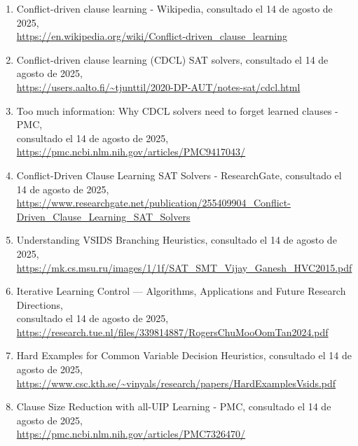 \documentclass{article}
\begin{document}
\begin{enumerate}
\item Conflict-driven clause learning - Wikipedia, consultado el 14 de agosto de 2025, \\ \url{https://en.wikipedia.org/wiki/Conflict-driven_clause_learning}
\item Conflict-driven clause learning (CDCL) SAT solvers, consultado el 14 de agosto de 2025, \\ \url{https://users.aalto.fi/~tjunttil/2020-DP-AUT/notes-sat/cdcl.html}
\item Too much information: Why CDCL solvers need to forget learned clauses - PMC, \\ consultado el 14 de agosto de 2025, \url{https://pmc.ncbi.nlm.nih.gov/articles/PMC9417043/}
\item Conflict-Driven Clause Learning SAT Solvers - ResearchGate, consultado el 14 de agosto de 2025, \\ \url{https://www.researchgate.net/publication/255409904_Conflict-Driven_Clause_Learning_SAT_Solvers}
\item Understanding VSIDS Branching Heuristics, consultado el 14 de agosto de 2025, \\ \url{https://mk.cs.msu.ru/images/1/1f/SAT_SMT_Vijay_Ganesh_HVC2015.pdf}
\item Iterative Learning Control — Algorithms, Applications and Future Research Directions, \\ consultado el 14 de agosto de 2025, \url{https://research.tue.nl/files/339814887/RogersChuMooOomTan2024.pdf}
\item Hard Examples for Common Variable Decision Heuristics, consultado el 14 de agosto de 2025, \\ \url{https://www.csc.kth.se/~vinyals/research/papers/HardExamplesVsids.pdf}
\item Clause Size Reduction with all-UIP Learning - PMC, consultado el 14 de agosto de 2025, \\ \url{https://pmc.ncbi.nlm.nih.gov/articles/PMC7326470/}
\end{enumerate}
\end{document}
